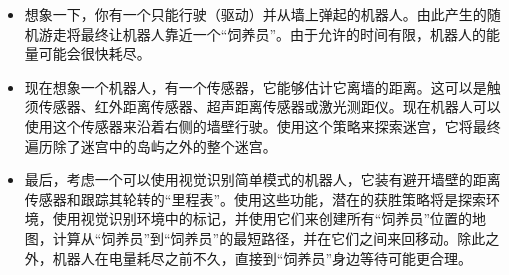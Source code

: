 
\begin{itemize}
\item 想象一下，你有一个只能行驶（驱动）并从墙上弹起的机器人。由此产生的随机游走将最终让机器人靠近一个“饲养员”。由于允许的时间有限，机器人的能量可能会很快耗尽。
\item 现在想象一个机器人，有一个传感器，它能够估计它离墙的距离。这可以是触须传感器、红外距离传感器、超声距离传感器或激光测距仪。现在机器人可以使用这个传感器来沿着右侧的墙壁行驶。使用这个策略来探索迷宫，它将最终遍历除了迷宫中的岛屿之外的整个迷宫。
\item 最后，考虑一个可以使用视觉识别简单模式的机器人，它装有避开墙壁的距离传感器和跟踪其轮转的“里程表”。使用这些功能，潜在的获胜策略将是探索环境，使用视觉识别环境中的标记，并使用它们来创建所有“饲养员”位置的地图，计算从“饲养员”到“饲养员”的最短路径，并在它们之间来回移动。除此之外，机器人在电量耗尽之前不久，直接到“饲养员”身边等待可能更合理。
\end{itemize}

